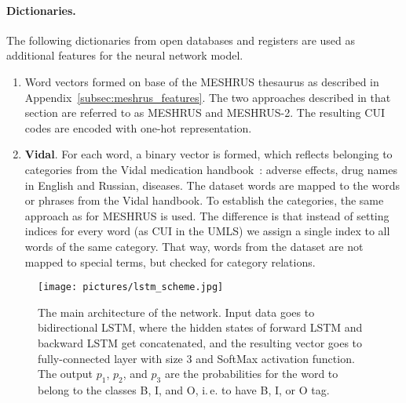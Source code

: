 \documentclass[a4paper,fleqn,longmktitle]{cas-dc}
\begin{document}
\paragraph{Dictionaries.} 
The following dictionaries from open databases and registers are used as additional features for the neural network model.
\begin{enumerate}
    \item Word vectors formed on base of the MESHRUS thesaurus as described in Appendix~\ref{subsec:meshrus_features}. The two approaches described in that section are referred to as MESHRUS and MESHRUS-2. The resulting CUI codes are encoded with one-hot representation.
    \item \textbf{Vidal}. 
    For each word, a binary vector is formed, which reflects belonging to categories from the Vidal medication handbook~\cite{Vidal2019}: adverse effects, drug names in English and Russian, diseases. The dataset words are mapped to the words or phrases from the Vidal handbook. To establish the categories, the same approach as for MESHRUS is used. The difference is that instead of setting indices for every word (as CUI in the UMLS) we assign a single index to all words of the same category. That way, words from the dataset are not mapped to special terms, but checked for category relations.
\end{enumerate}


\begin{figure}
\centering
\texttt{[image: pictures/lstm\_scheme.jpg]}
\caption{The main architecture of the network. Input data goes to bidirectional LSTM, where the hidden states of forward LSTM and backward LSTM get concatenated, and the resulting vector goes to fully-connected layer with size 3 and SoftMax activation function. The output $p_{1}$, $p_{2}$, and $p_{3}$ are the probabilities for the word to belong to the classes B, I, and O, i.\,e. to have B, I, or O tag.}
\label{fig:lstm}
\end{figure}
\end{document}
